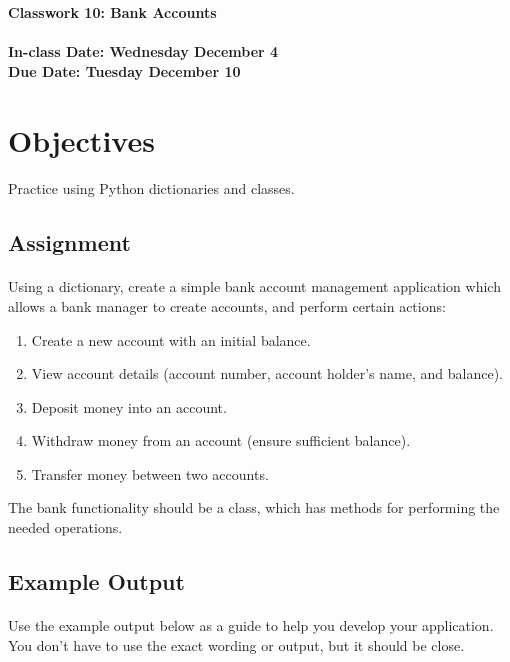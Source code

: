 \documentclass[letter,10pt]{article}
\begin{document}
    
    \huge
    \textbf{Classwork 10: Bank Accounts}
    \normalsize
    \\ ~~ \\
    \textbf{In-class Date: Wednesday December 4} \\
    \textbf{Due Date: Tuesday December 10}
    
    \section*{Objectives}
    \paragraph{}Practice using Python dictionaries and classes.
    
    \subsection*{Assignment}
    \paragraph{}Using a dictionary, create a simple bank account management application which allows a bank manager to create accounts, and perform certain actions:
    \begin{enumerate}
        \item Create a new account with an initial balance.
        \item View account details (account number, account holder's name, and balance).
        \item Deposit money into an account.
        \item Withdraw money from an account (ensure sufficient balance).
        \item Transfer money between two accounts.
    \end{enumerate}
    
    The bank functionality should be a class, which has methods for performing the needed operations.
    
    \subsection*{Example Output}
    \paragraph{}Use the example output below as a guide to help you develop your application. You don't have to use the exact wording or output, but it should be close.
    
\end{document}
